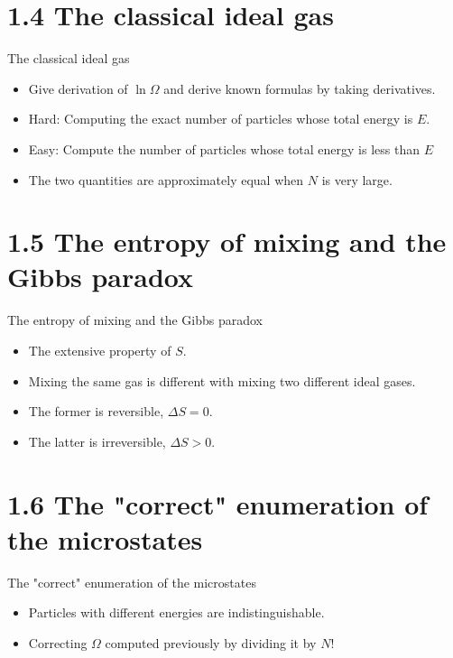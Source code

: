 \documentclass{beamer}
\begin{document}
\section{1.4 The classical ideal gas}
\begin{frame}{The classical ideal gas}
    \begin{itemize}
        \item 
    Give derivation of $\ln \Omega$ and derive known formulas by taking derivatives.

    \item  Hard: Computing the exact number of particles whose total energy is $E$.
    
    \item  Easy: Compute the number of particles whose total energy is less than $E$
    
    \item The two quantities are approximately equal when $N$ is very large.    
    \end{itemize}
\end{frame}
\section{1.5 The entropy of mixing and the Gibbs paradox}
\begin{frame}{The entropy of mixing and the Gibbs paradox}
    \begin{itemize}
        \item The extensive property of $S$.

        \item Mixing the same gas is different with mixing two different ideal gases.
    
        \item The former is reversible, $\Delta S = 0$.
    
        \item The latter is irreversible, $\Delta S > 0$.
    
    \end{itemize}
\end{frame}
\section{1.6 The "correct" enumeration of the microstates}
\begin{frame}{The "correct" enumeration of the microstates}
    \begin{itemize}
        \item Particles with different energies are indistinguishable. 
    
    \item Correcting $\Omega$ computed previously by dividing it by $N!$
    \end{itemize}
\end{frame}
\end{document}
